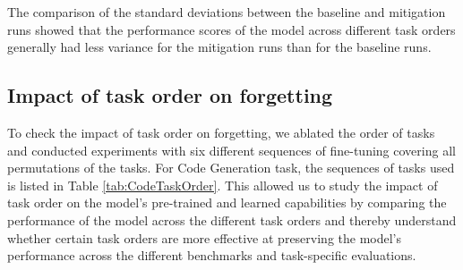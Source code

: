 The comparison of the standard deviations between the baseline and mitigation runs showed that the performance scores of the model across different task orders generally had less variance for the mitigation runs than for the baseline runs. 

\subsection{Impact of task order on forgetting} \label{CodeTaskOrderImpact}
To check the impact of task order on forgetting, we ablated the order  of tasks and conducted experiments with six different sequences of fine-tuning covering all permutations of the tasks. For Code Generation task, the sequences of tasks used is listed in Table \ref{tab:CodeTaskOrder}. This allowed us to study the impact of task order on the model's pre-trained and learned capabilities by comparing the performance of the model across the different task orders and thereby understand whether certain task orders are more effective at preserving the model's performance across the different benchmarks and task-specific evaluations. 

